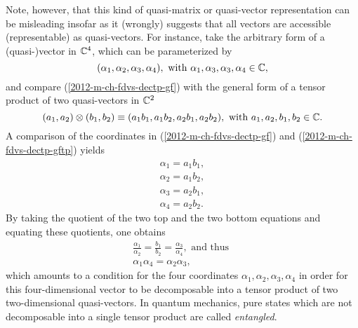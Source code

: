 Note, however, that this kind of quasi-matrix or quasi-vector representation can be misleading insofar as
it (wrongly) suggests that all vectors are accessible (representable) as quasi-vectors. \label{2012-m-c-fdvs-entanglement}
For instance, take the arbitrary form of a (quasi-)vector in ${\Bbb C}^4$, which can be parameterized by
\begin{equation}
(\alpha_1,\alpha_2,\alpha_3,\alpha_4), \textrm{ with } \alpha_1,\alpha_3,\alpha_3,\alpha_4 \in {\Bbb C},
\label{2012-m-ch-fdvs-dectp-gf}
\end{equation}
and compare (\ref{2012-m-ch-fdvs-dectp-gf}) with the general form of a tensor product of two quasi-vectors in  ${\Bbb C}^2$
\begin{equation}
(a_1,a_2)\otimes (b_1,b_2)\equiv (a_1b_1, a_1 b_2,a_2b_1,a_2b_2), \textrm{ with } a_1,a_2,b_1,b_2\in {\Bbb C}.
\label{2012-m-ch-fdvs-dectp-gftp}
\end{equation}
A comparison of the coordinates in
(\ref{2012-m-ch-fdvs-dectp-gf})
and
(\ref{2012-m-ch-fdvs-dectp-gftp})
yields
\begin{equation}
\begin{split}
\alpha_1=a_1b_1,\\
\alpha_2=a_1b_2,\\
\alpha_3=a_2b_1,\\
\alpha_4=a_2b_2.
\end{split}
\label{2012-m-ch-fdvs-dectp-gftp-a}
\end{equation}
By taking the quotient of the two top and the two bottom equations and equating these quotients, one obtains
\begin{equation}
\begin{split}
\frac{\alpha_1}{\alpha_2}=\frac{b_1}{b_2}
=\frac{\alpha_3}{\alpha_4},\textrm{ and thus }\\
{\alpha_1}{\alpha_4}={\alpha_2}{\alpha_3},
\end{split}
\label{2012-m-ch-fdvs-dectp-gftp-fr}
\end{equation}
which amounts to a condition for the four coordinates  $\alpha_1,\alpha_2,\alpha_3,\alpha_4$
in order for this four-dimensional vector to be decomposable into a tensor product of two two-dimensional quasi-vectors.
In quantum mechanics, pure states which are not decomposable into a single tensor product
are called {\em entangled}.


